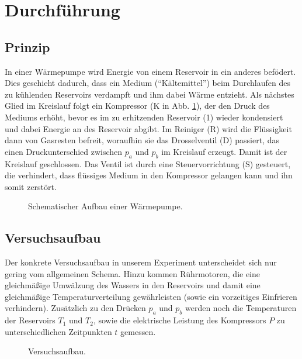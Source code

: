 \section{Durchführung}
\label{sec:Durchführung}
\subsection{Prinzip}
In einer Wärmepumpe wird Energie von einem Reservoir in ein anderes befödert. Dies geschieht dadurch, dass ein Medium (\enquote{Kältemittel}) beim Durchlaufen des zu kühlenden Reservoirs verdampft und ihm dabei Wärme entzieht. Als nächstes Glied im Kreislauf folgt ein Kompressor (K in Abb. \ref{fig:wärmepumpe}), der den Druck des Mediums erhöht, bevor es im zu erhitzenden Reservoir (1) wieder kondensiert und dabei Energie an des Reservoir abgibt. Im Reiniger (R) wird die Flüssigkeit dann von Gasresten befreit, woraufhin sie das Drosselventil (D) passiert, das einen Druckunterschied zwischen $p_a$ und $p_b$ im Kreislauf erzeugt. Damit ist der Kreislauf geschlossen. Das Ventil ist durch eine Steuervorrichtung (S) gesteuert, die verhindert, dass flüssiges Medium in den Kompressor gelangen kann und ihn somit zerstört.

\begin{figure}
  \centering
  \def\svgwidth{\columnwidth}
  
  \caption{Schematischer Aufbau einer Wärmepumpe.}
  \label{fig:wärmepumpe}
\end{figure}

\subsection{Versuchsaufbau}
Der konkrete Versuchsaufbau in unserem Experiment unterscheidet sich nur gering vom allgemeinen Schema. Hinzu kommen Rührmotoren, die eine gleichmäßige Umwälzung des Wassers in den Reservoirs und damit eine gleichmäßige Temperaturverteilung gewährleisten (sowie ein vorzeitiges Einfrieren verhindern). Zusätzlich zu den Drücken $p_a$ und $p_b$ werden noch die Temperaturen der Reservoirs $T_{1}$ und $T_{2}$, sowie die elektrische Leistung des Kompressors $P$ zu unterschiedlichen Zeitpunkten $t$ gemessen.

\begin{figure}
  \centering
  
  \caption{Versuchsaufbau.}
  \label{fig:aufbau}
\end{figure}
